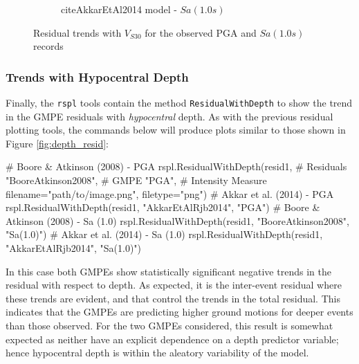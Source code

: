 \begin{figure}[htb]
\begin{subfigure}[b]{0.49\textwidth}
     \caption{citeAkkarEtAl2014 model - $Sa \left( {1.0 s} \right)$}
      \label{fig:sa1_vs30_akkar2014}
  \end{subfigure}
  \caption{Residual trends with $V_{S30}$ for the observed PGA and $Sa \left( {1.0 s} \right)$ records}
  \label{fig:vs30_resid}
\end{figure}

\subsubsection{Trends with Hypocentral Depth}

Finally, the \verb=rspl= tools contain the method \verb=ResidualWithDepth= to show the trend in the GMPE residuals with \emph{hypocentral} depth. As with the previous residual plotting tools, the commands below will produce plots similar to those shown in Figure \ref{fig:depth_resid}:

 \begin{python}[frame=single]
# Boore & Atkinson (2008)  - PGA
rspl.ResidualWithDepth(resid1,  # Residuals
                      "BooreAtkinson2008",  # GMPE
                      "PGA",   # Intensity Measure
                      filename="path/to/image.png",
                      filetype="png")
# Akkar et al. (2014)  - PGA
rspl.ResidualWithDepth(resid1, "AkkarEtAlRjb2014", "PGA") 
# Boore & Atkinson (2008)  - Sa (1.0)
rspl.ResidualWithDepth(resid1, "BooreAtkinson2008", "Sa(1.0)") 
# Akkar et al. (2014)  - Sa (1.0)
rspl.ResidualWithDepth(resid1, "AkkarEtAlRjb2014", "Sa(1.0)")                         
\end{python}

In this case both GMPEs show statistically significant negative trends in the residual with respect to depth. As expected, it is the inter-event residual where these trends are evident, and that control the trends in the total residual. This indicates that the GMPEs are predicting higher ground motions for deeper events than those observed. For the two GMPEs considered, this result is somewhat expected as neither have an explicit dependence on a depth predictor variable; hence hypocentral depth is within the aleatory variability of the model. 

